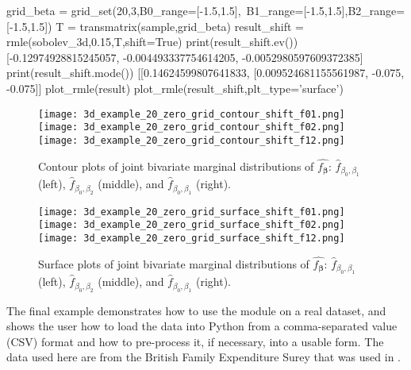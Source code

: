 \documentclass[a4paper,12pt]{article}
\newcommand{\bbeta}{{\boldsymbol{\beta}}}
\begin{document}
\begin{python}
grid_beta = grid_set(20,3,B0_range=[-1.5,1.5],\ 
B1_range=[-1.5,1.5],B2_range=[-1.5,1.5])
T = transmatrix(sample,grid_beta)
result_shift = rmle(sobolev_3d,0.15,T,shift=True)
print(result_shift.ev())
[-0.12974928815245057, -0.004493337754614205, -0.0052980597609372385]
print(result_shift.mode())
[[0.14624599807641833, [0.009524681155561987, -0.075, -0.075]]
plot_rmle(result)
plot_rmle(result_shift,plt_type='surface')
\end{python}

\begin{figure}[htp]
	
	\centering
	\texttt{[image: 3d\_example\_20\_zero\_grid\_contour\_shift\_f01.png]}\hfill
	\texttt{[image: 3d\_example\_20\_zero\_grid\_contour\_shift\_f02.png]}\hfill
	\texttt{[image: 3d\_example\_20\_zero\_grid\_contour\_shift\_f12.png]}
	
	\caption{Contour plots of joint bivariate marginal distributions of $\hat{f_\bbeta}$: $\hat{f}_{\beta_0,\beta_1}$ (left), $\hat{f}_{\beta_0,\beta_2}$ (middle), and $\hat{f}_{\beta_0,\beta_1}$ (right).}
	\label{fig:3d_20_grid_contour_shift}
	
\end{figure}

\begin{figure}[htp]
	
	\centering
	\texttt{[image: 3d\_example\_20\_zero\_grid\_surface\_shift\_f01.png]}\hfill
	\texttt{[image: 3d\_example\_20\_zero\_grid\_surface\_shift\_f02.png]}\hfill
	\texttt{[image: 3d\_example\_20\_zero\_grid\_surface\_shift\_f12.png]}
	
	\caption{Surface plots of joint bivariate marginal distributions of $\hat{f_\bbeta}$: $\hat{f}_{\beta_0,\beta_1}$ (left), $\hat{f}_{\beta_0,\beta_2}$ (middle), and $\hat{f}_{\beta_0,\beta_1}$ (right).}
	\label{fig:3d_20_grid_surface_shift}
	
\end{figure}
The final example demonstrates how to use the module on a real dataset, and shows the user how to load the data into Python from a comma-separated value (CSV) format and how to pre-process it, if necessary, into a usable form. The data used here are from the British Family Expenditure Surey that was used in \cite{Dunker2019,dunker2021regularized}.
\end{document}
